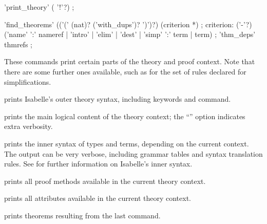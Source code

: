\begin{isabellebody}
\begin{isamarkuptext}
  \begin{rail}
    'print\_theory' ( '!'?)
    ;

    'find\_theorems' (('(' (nat)? ('with\_dups')? ')')?) (criterion *)
    ;
    criterion: ('-'?) ('name' ':' nameref | 'intro' | 'elim' | 'dest' |
      'simp' ':' term | term)
    ;
    'thm\_deps' thmrefs
    ;
  \end{rail}

  These commands print certain parts of the theory and proof context.
  Note that there are some further ones available, such as for the set
  of rules declared for simplifications.

  \begin{descr}
  
  \item [\mbox{\isa{\isacommand{print{\isacharunderscore}commands}}}] prints Isabelle's outer theory
  syntax, including keywords and command.
  
  \item [\mbox{\isa{\isacommand{print{\isacharunderscore}theory}}}] prints the main logical content of
  the theory context; the ``\isa{{\isachardoublequote}{\isacharbang}{\isachardoublequote}}'' option indicates extra
  verbosity.

  \item [\mbox{\isa{\isacommand{print{\isacharunderscore}syntax}}}] prints the inner syntax of types
  and terms, depending on the current context.  The output can be very
  verbose, including grammar tables and syntax translation rules.  See
  \cite[\S7, \S8]{isabelle-ref} for further information on Isabelle's
  inner syntax.
  
  \item [\mbox{\isa{\isacommand{print{\isacharunderscore}methods}}}] prints all proof methods
  available in the current theory context.
  
  \item [\mbox{\isa{\isacommand{print{\isacharunderscore}attributes}}}] prints all attributes
  available in the current theory context.
  
  \item [\mbox{\isa{\isacommand{print{\isacharunderscore}theorems}}}] prints theorems resulting from
  the last command.
  

\end{descr}
\end{isamarkuptext}
\end{isabellebody}
